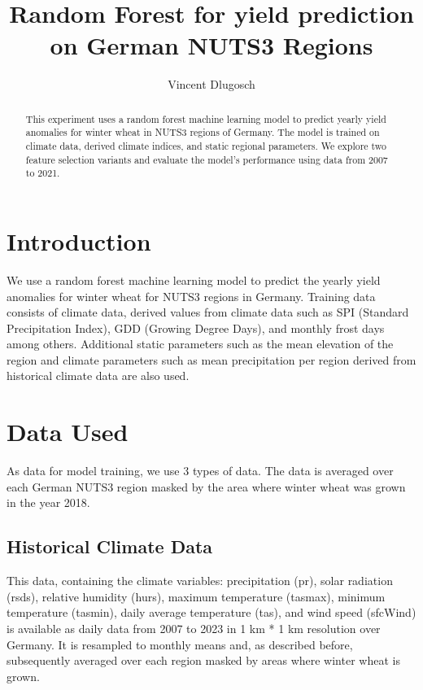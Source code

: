 \documentclass{article}
\title{Random Forest for yield prediction on German NUTS3 Regions}
\author{Vincent Dlugosch}
\begin{document}
\maketitle


\begin{abstract}
	This experiment uses a random forest machine learning model to predict yearly yield anomalies for winter wheat in NUTS3 regions of Germany. The model is trained on climate data, derived climate indices, and static regional parameters. We explore two feature selection variants and evaluate the model's performance using data from 2007 to 2021.
\end{abstract}
\section{Introduction}
We use a random forest machine learning model to predict the yearly yield anomalies for winter wheat for NUTS3 regions in Germany. Training data consists of climate data, derived values from climate data such as SPI (Standard Precipitation Index), GDD (Growing Degree Days), and monthly frost days among others. Additional static parameters such as the mean elevation of the region and climate parameters such as mean precipitation per region derived from historical climate data are also used.
\section{Data Used}
As data for model training, we use 3 types of data. The data is averaged over each German NUTS3 region masked by the area where winter wheat was grown in the year 2018.
\subsection{Historical Climate Data}
This data, containing the climate variables: precipitation (pr), solar radiation (rsds), relative humidity (hurs), maximum temperature (tasmax), minimum temperature (tasmin), daily average temperature (tas), and wind speed (sfcWind) is available as daily data from 2007 to 2023 in 1 km * 1 km resolution over Germany.
It is resampled to monthly means and, as described before, subsequently averaged over each region masked by areas where winter wheat is grown.
\end{document}
